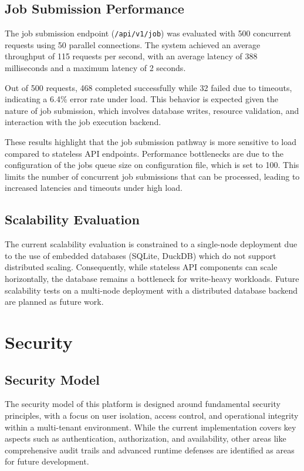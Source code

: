 \subsection*{Job Submission Performance}
The job submission endpoint (\texttt{/api/v1/job}) was evaluated with 500 concurrent
requests using 50 parallel connections. The system achieved an average throughput of 115 requests 
per second, with an average latency of 388 milliseconds and a maximum latency of 2 seconds.

Out of 500 requests, 468 completed successfully while 32 failed due to timeouts, indicating a 
6.4\% error rate under load. This behavior is expected given the nature of job submission, 
which involves database writes, resource validation, and interaction with the job execution backend. 

These results highlight that the job submission pathway is more sensitive to load compared to 
stateless API endpoints. Performance bottlenecks are due to the configuration of the jobs queue 
size on configuration file, which is set to 100. This limits the number of concurrent job 
submissions that can be processed, leading to increased latencies and timeouts under high load. 



\subsection{Scalability Evaluation}
The current scalability evaluation is constrained to a single-node deployment due to the use of 
embedded databases (SQLite, DuckDB) which do not support distributed scaling. Consequently, while 
stateless API components can scale horizontally, the database remains a bottleneck for write-heavy 
workloads. Future scalability tests on a multi-node deployment with a distributed database backend 
are planned as future work.


\newpage
\section{Security}

\subsection{Security Model}

The security model of this platform is designed around fundamental security principles, with a focus 
on user isolation, access control, and operational integrity within a multi-tenant environment. While 
the current implementation covers key aspects such as authentication, authorization, and availability, 
other areas like comprehensive audit trails and advanced runtime defenses are identified as areas for 
future development.

